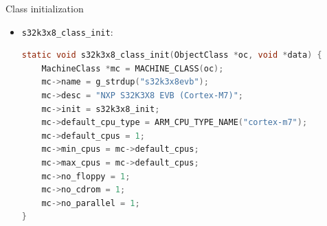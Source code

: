 \begin{frame}[fragile]{Class initialization}
    \begin{itemize}
    \item \texttt{s32k3x8\_class\_init}:
        \begin{lstlisting}[language=C]
static void s32k3x8_class_init(ObjectClass *oc, void *data) {
    MachineClass *mc = MACHINE_CLASS(oc);
    mc->name = g_strdup("s32k3x8evb");
    mc->desc = "NXP S32K3X8 EVB (Cortex-M7)";
    mc->init = s32k3x8_init;
    mc->default_cpu_type = ARM_CPU_TYPE_NAME("cortex-m7");
    mc->default_cpus = 1;
    mc->min_cpus = mc->default_cpus;
    mc->max_cpus = mc->default_cpus;
    mc->no_floppy = 1;
    mc->no_cdrom = 1;
    mc->no_parallel = 1;
}
        \end{lstlisting}
    \end{itemize}

\end{frame}


